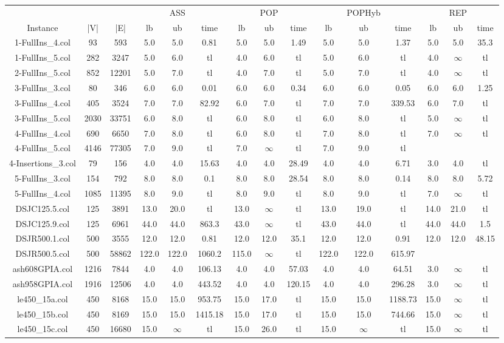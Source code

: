 \begin{tabular}{|c|c c|c c c|c c c|c c c|c c c|}
\hline
&&&&ASS&&&POP&&&POPHyb&&&REP\\
Instance & |V| & |E|&lb&ub&time&lb&ub&time&lb&ub&time&lb&ub&time\\
\hline
1-FullIns\_4.col&93&593&5.0&5.0&0.81&5.0&5.0&1.49&5.0&5.0&1.37&5.0&5.0&35.3\\
1-FullIns\_5.col&282&3247&5.0&6.0&tl&4.0&6.0&tl&5.0&6.0&tl&4.0&$\infty$&tl\\
2-FullIns\_5.col&852&12201&5.0&7.0&tl&4.0&7.0&tl&5.0&7.0&tl&4.0&$\infty$&tl\\
3-FullIns\_3.col&80&346&6.0&6.0&0.01&6.0&6.0&0.34&6.0&6.0&0.05&6.0&6.0&1.25\\
3-FullIns\_4.col&405&3524&7.0&7.0&82.92&6.0&7.0&tl&7.0&7.0&339.53&6.0&7.0&tl\\
3-FullIns\_5.col&2030&33751&6.0&8.0&tl&6.0&8.0&tl&6.0&8.0&tl&5.0&$\infty$&tl\\
4-FullIns\_4.col&690&6650&7.0&8.0&tl&6.0&8.0&tl&7.0&8.0&tl&7.0&$\infty$&tl\\
4-FullIns\_5.col&4146&77305&7.0&9.0&tl&7.0&$\infty$&tl&7.0&9.0&tl\\
4-Insertions\_3.col&79&156&4.0&4.0&15.63&4.0&4.0&28.49&4.0&4.0&6.71&3.0&4.0&tl\\
5-FullIns\_3.col&154&792&8.0&8.0&0.1&8.0&8.0&28.54&8.0&8.0&0.14&8.0&8.0&5.72\\
5-FullIns\_4.col&1085&11395&8.0&9.0&tl&8.0&9.0&tl&8.0&9.0&tl&7.0&$\infty$&tl\\
DSJC125.5.col&125&3891&13.0&20.0&tl&13.0&$\infty$&tl&13.0&19.0&tl&14.0&21.0&tl\\
DSJC125.9.col&125&6961&44.0&44.0&863.3&43.0&$\infty$&tl&43.0&44.0&tl&44.0&44.0&1.5\\
DSJR500.1.col&500&3555&12.0&12.0&0.81&12.0&12.0&35.1&12.0&12.0&0.91&12.0&12.0&48.15\\
DSJR500.5.col&500&58862&122.0&122.0&1060.2&115.0&$\infty$&tl&122.0&122.0&615.97\\
ash608GPIA.col&1216&7844&4.0&4.0&106.13&4.0&4.0&57.03&4.0&4.0&64.51&3.0&$\infty$&tl\\
ash958GPIA.col&1916&12506&4.0&4.0&443.52&4.0&4.0&120.15&4.0&4.0&296.28&3.0&$\infty$&tl\\
le450\_15a.col&450&8168&15.0&15.0&953.75&15.0&17.0&tl&15.0&15.0&1188.73&15.0&$\infty$&tl\\
le450\_15b.col&450&8169&15.0&15.0&1415.18&15.0&17.0&tl&15.0&15.0&744.66&15.0&$\infty$&tl\\
le450\_15c.col&450&16680&15.0&$\infty$&tl&15.0&26.0&tl&15.0&$\infty$&tl&15.0&$\infty$&tl\\

\end{tabular}
